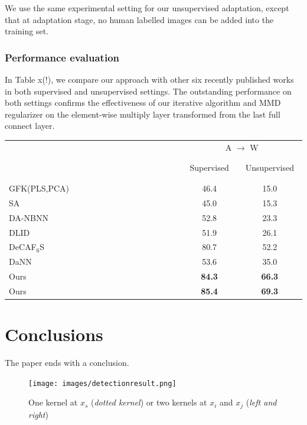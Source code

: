 \documentclass[runningheads]{llncs}
\begin{document}
We use the same experimental setting for our unsupervised adaptation, except that at adaptation stage, no human labelled images can be added into the training set.
\subsubsection{Performance evaluation}
In Table x(!), we compare our approach with other six recently published works in both supervised and unsupervised settings. The outstanding performance on both settings confirms the effectiveness of our iterative algorithm and MMD regularizer on the element-wise multiply layer transformed from the last full connect layer.


\begin{table}
\centering
\begin{tabular}{l c c}
  \hline
   & \multicolumn{2}{c}{A $\rightarrow$ W}    \\
   \cline{2-3}
   ~~~~~~~~~~~~~~~~~~~~~~~~~~~~~~~
   ~~~~~~~~~~~~~~~~~~~~~~~~~~~~~~~
    & ~Supervised~ & ~Unsupervised~ \\
  \hline
  GFK(PLS,PCA)\cite{gong2012geodesic} & 46.4 & 15.0 \\
  SA \cite{fernando2013unsupervised} & 45.0 & 15.3 \\
  DA-NBNN \cite{tommasi2013frustratingly} & 52.8 & 23.3 \\
  DLID \cite{chopra2013dlid}& 51.9 & 26.1 \\
  DeCAF${}_{6}$S \cite{donahue2013decaf} & 80.7 & 52.2 \\
  DaNN \cite{ghifary2014domain}& 53.6 & 35.0 \\
  \hline
  Ours & {\bf 84.3} & {\bf 66.3} \\
  Ours & {\bf 85.4} & {\bf 69.3} \\
  \hline
\end{tabular}
\end{table}


\section{Conclusions}
\label{section:Conclusions}

The paper ends with a conclusion.

\begin{figure}
\centering
\texttt{[image: images/detectionresult.png]}
\caption{One kernel at $x_s$ ({\it dotted kernel}) or two kernels at
$x_i$ and $x_j$ ({\it left and right}) }
\label{fig:example}
\end{figure}



\end{document}
